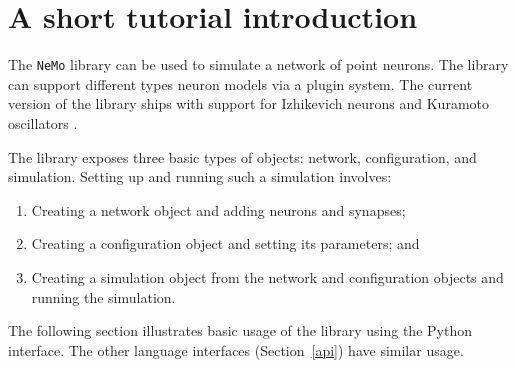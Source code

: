 \documentclass[a4paper]{article}
\newcommand{\nemo}{\texttt{NeMo}\xspace}
\newcommand{\cpp}{C\nolinebreak\hspace{-.05em}\raisebox{.4ex}{\tiny\bf +}\nolinebreak\hspace{-.10em}\raisebox{.4ex}{\tiny\bf +}\xspace}
\begin{document}
\maketitle

\begin{abstract}

\nemo is a library for discrete-time simulation of spiking neural networks. It
is aimed at real-time simulation of tens of thousands of neurons on a single
workstation. \nemo runs on parallel hardware; in particular it can run on
CUDA-enabled GPUs. No parallel programming is required on the part of the end
user, as parallelisation is handled by the library. The library has interfaces
in \cpp, C, Python, and Matlab.

\end{abstract}



\section{A short tutorial introduction}

The \nemo library can be used to simulate a network of point neurons. The
library can support different types neuron models via a plugin system. The
current version of the library ships with support for Izhikevich neurons
\cite{izhikevich2003simple_model} and Kuramoto oscillators \cite{Kuramoto1984}.

The library exposes three basic types of objects: network, configuration, and
simulation. Setting up and running such a simulation involves:

\begin{enumerate}

  \item Creating a network object and adding neurons and synapses;

  \item Creating a configuration object and setting its parameters; and

  \item Creating a simulation object from the network and configuration objects
  and running the simulation.

\end{enumerate}

The following section illustrates basic usage of the library using the Python interface.
The other language interfaces (Section~\ref{api}) have similar usage.
\end{document}
